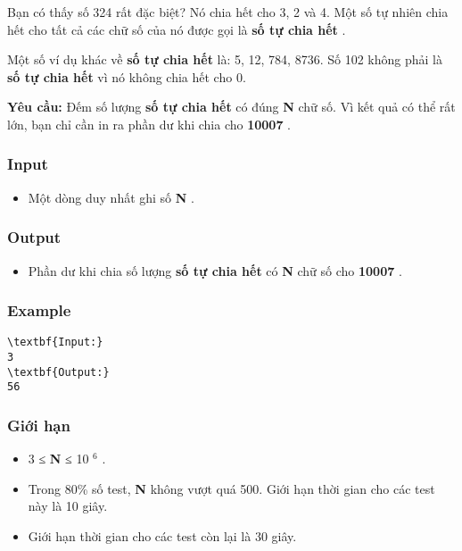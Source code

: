 

Bạn có thấy số 324 rất đặc biệt? Nó chia hết cho 3, 2 và 4. Một số tự nhiên chia hết cho tất cả các chữ số của nó được gọi là \textbf{ số tự chia hết } .

Một số ví dụ khác về \textbf{ số tự chia hết } là: 5, 12, 784, 8736. Số 102 không phải là \textbf{ số tự chia hết } vì nó không chia hết cho 0.

\textbf{Yêu cầu: } Đếm số lượng \textbf{ số tự chia hết } có đúng \textbf{ N } chữ số. Vì kết quả có thể rất lớn, bạn chỉ cần in ra phần dư khi chia cho \textbf{ 10007 } . \textbf{}

\subsubsection{Input}
\begin{itemize}
	\item Một dòng duy nhất ghi số \textbf{ N } .
\end{itemize}

\subsubsection{Output}
\begin{itemize}
	\item Phần dư khi chia số lượng \textbf{ số tự chia hết } có \textbf{ N } chữ số cho \textbf{ 10007 } .
\end{itemize}

\subsubsection{Example}
\begin{verbatim}
\textbf{Input:}
3
\textbf{Output:}
56\end{verbatim}

\subsubsection{Giới hạn}
\begin{itemize}
	\item 3 ≤ \textbf{ N } ≤ 10 $^ 6 $ .
	\item Trong 80\% số test, \textbf{ N } không vượt quá 500. Giới hạn thời gian cho các test này là 10 giây.
	\item Giới hạn thời gian cho các test còn lại là 30 giây.
\end{itemize}